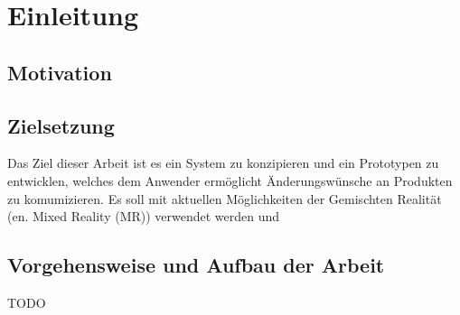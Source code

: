 \chapter{Einleitung}

\section{Motivation}


\section{Zielsetzung}

Das Ziel dieser Arbeit ist es ein System zu konzipieren und ein Prototypen zu entwicklen, welches dem Anwender ermöglicht Änderungswünsche an Produkten 
zu komumizieren. Es soll mit aktuellen Möglichkeiten der Gemischten Realität (en. Mixed Reality (MR)) verwendet werden und 



\section{Vorgehensweise und Aufbau der Arbeit}
TODO

